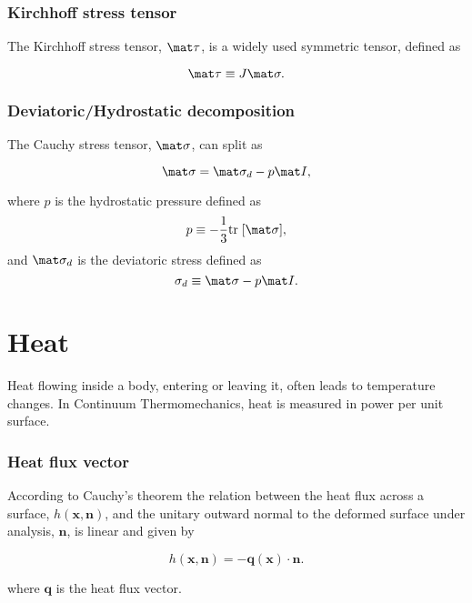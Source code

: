 \subsubsection{Kirchhoff stress tensor}

The Kirchhoff stress tensor, $\mat \tau$, is a widely used symmetric tensor, defined as
\begin{highlight}
    \begin{equation}
        \mat \tau \equiv J\mat \sigma.
    \end{equation}
\end{highlight}

\subsubsection{Deviatoric/Hydrostatic decomposition}

The Cauchy stress tensor, $\mat \sigma$, can split as
\begin{highlight}
    \begin{equation}
        \mat \sigma = \mat \sigma_d - p\mat I,
    \end{equation}
\end{highlight}
where $p$ is the hydrostatic pressure defined as
\begin{equation}
    p \equiv -\frac{1}{3}\text{tr}\;[\mat \sigma],
\end{equation}
and $\mat \sigma_d$ is the deviatoric stress defined as
\begin{equation}
    \sigma_d \equiv \mat \sigma - p\mat I.
\end{equation}

\section{Heat}

Heat flowing inside a body, entering or leaving it, often leads to temperature changes.
In Continuum Thermomechanics, heat is measured in power per unit surface.

\subsubsection{Heat flux vector}

According to Cauchy's theorem the relation between the heat flux across a surface, \(h(\bm x, \bm n)\), and the unitary outward normal to the deformed surface under analysis, \(\bm n\), is linear and given by
\begin{highlight}
  \begin{equation}
    h(\bm x, \bm n ) = -\bm q(\bm x)\cdot \bm n.
  \end{equation}
\end{highlight}
where \(\bm q\) is the heat flux vector.

